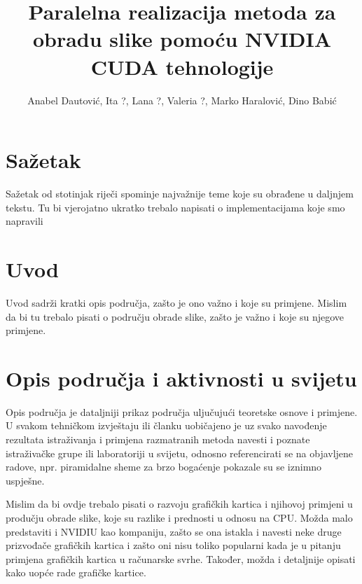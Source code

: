 \documentclass[a4paper,twocolumn]{article}
\begin{document}
	
	\title{Paralelna realizacija metoda za obradu slike pomoću NVIDIA CUDA tehnologije} 
	\author{Anabel Dautović, Ita ?, Lana ?, Valeria ?, Marko Haralović, Dino Babić}
	\maketitle
	
	
	\section*{Sažetak}
	Sažetak od stotinjak riječi spominje najvažnije
	teme koje su obrađene u daljnjem tekstu. Tu bi vjerojatno ukratko trebalo napisati o 
	implementacijama koje smo napravili	
	
	
	\section{Uvod}
	Uvod sadrži kratki opis područja, zašto je ono
	važno i koje su primjene. Mislim da bi tu trebalo pisati o području obrade slike, zašto je važno i koje su njegove primjene.
	
	
	\section{Opis područja i aktivnosti u svijetu}
	Opis područja je dataljniji prikaz područja uljučujući
	teoretske osnove i primjene.
	U svakom tehničkom izvještaju ili članku uobičajeno
	je uz svako navođenje rezultata istraživanja i
	primjena razmatranih metoda navesti i poznate istraživačke
	grupe ili laboratoriji u svijetu, odnosno
	referencirati se na objavljene radove, npr. piramidalne
	sheme za brzo bogaćenje pokazale su se iznimno
	uspješne.
	
	Mislim da bi ovdje trebalo pisati o razvoju grafičkih kartica i njihovoj primjeni u produčju obrade slike, koje su razlike i prednosti u odnosu na CPU. Možda malo predstaviti i NVIDIU kao kompaniju, zašto se ona istakla i navesti neke druge prizvođače grafičkih kartica i zašto oni nisu toliko popularni kada je u pitanju primjena grafičkih kartica u računarske svrhe. Također, možda i detaljnije opisati kako uopće rade grafičke kartice.
	
\end{document}
